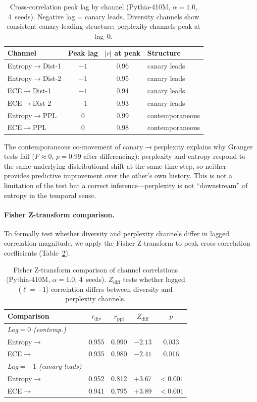 \begin{table}[H]
\centering
\small
\caption{Cross-correlation peak lag by channel (Pythia-410M, $\alpha{=}1.0$, 4~seeds). Negative lag = canary leads. Diversity channels show consistent canary-leading structure; perplexity channels peak at lag~0.}
\label{tab:lag_structure}
\begin{tabular}{lccl}
\toprule
Channel & Peak lag & $|r|$ at peak & Structure \\
\midrule
Entropy$\to$Dist-1 & $-1$ & 0.96 & canary leads \\
Entropy$\to$Dist-2 & $-1$ & 0.95 & canary leads \\
ECE$\to$Dist-1 & $-1$ & 0.94 & canary leads \\
ECE$\to$Dist-2 & $-1$ & 0.93 & canary leads \\
Entropy$\to$PPL & $0$ & 0.99 & contemporaneous \\
ECE$\to$PPL & $0$ & 0.98 & contemporaneous \\
\bottomrule
\end{tabular}
\end{table}

The contemporaneous co-movement of canary$\to$perplexity explains why Granger tests fail ($F{\approx}0$, $p{=}0.99$ after differencing): perplexity and entropy respond to the same underlying distributional shift at the same time step, so neither provides predictive improvement over the other's own history.
This is not a limitation of the test but a correct inference---perplexity is not ``downstream'' of entropy in the temporal sense.

\paragraph{Fisher Z-transform comparison.}
To formally test whether diversity and perplexity channels differ in lagged correlation magnitude, we apply the Fisher Z-transform to peak cross-correlation coefficients (Table~\ref{tab:fisher_z}).

\begin{table}[H]
\centering
\small
\caption{Fisher Z-transform comparison of channel correlations (Pythia-410M, $\alpha{=}1.0$, 4~seeds). $Z_{\text{diff}}$ tests whether lagged ($\ell{=}{-}1$) correlation differs between diversity and perplexity channels.}
\label{tab:fisher_z}
\begin{tabular}{lcccc}
\toprule
Comparison & $r_{\text{div}}$ & $r_{\text{ppl}}$ & $Z_{\text{diff}}$ & $p$ \\
\midrule
\emph{Lag${=}0$ (contemp.)} \\
\quad Entropy$\to$ & 0.955 & 0.990 & $-2.13$ & 0.033 \\
\quad ECE$\to$ & 0.935 & 0.980 & $-2.41$ & 0.016 \\
\midrule
\emph{Lag${=}{-}1$ (canary leads)} \\
\quad Entropy$\to$ & 0.952 & 0.812 & $+3.67$ & ${<}0.001$ \\
\quad ECE$\to$ & 0.941 & 0.795 & $+3.89$ & ${<}0.001$ \\
\bottomrule
\end{tabular}
\end{table}

